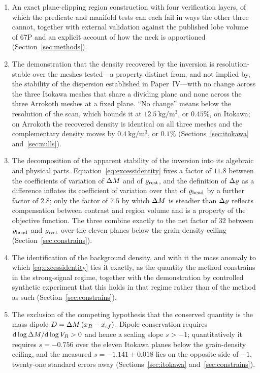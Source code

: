 \begin{enumerate}
\item An exact plane-clipping region construction with four verification
layers, of which the predicate and manifold tests can each fail in ways
the other three cannot, together with external validation against the
published lobe volume of 67P and an explicit account of how the neck is
apportioned (Section~\ref{sec:methods}).

\item The demonstration that the density recovered by the inversion is
resolution-stable over the meshes tested---a property distinct from, and
not implied by, the stability of the dispersion established in
Paper~IV---with no change across the three Itokawa meshes that share a
dividing plane and none across the three Arrokoth meshes at a fixed plane.
``No change'' means below the resolution of the scan, which bounds it at
$\SI{12.5}{\kilo\gram\per\cubic\metre}$, or $0.45\%$, on Itokawa; on
Arrokoth the recovered density is identical on all three meshes and the
complementary density moves by $\SI{0.4}{\kilo\gram\per\cubic\metre}$, or
$0.1\%$ (Sections~\ref{sec:itokawa} and~\ref{sec:nulls}).

\item The decomposition of the apparent stability of the inversion into
its algebraic and physical parts. Equation~\eqref{eq:excessidentity}
fixes a factor of $11.8$ between the coefficients of variation of $\Delta M$
and of $\varrho_{\mathrm{rest}}$, and the definition of $\Delta\varrho$ as a difference inflates
its coefficient of variation over that of $\varrho_{\mathrm{head}}$ by a further factor of
$2.8$; only the factor of $7.5$ by which $\Delta M$ is steadier than $\Delta\varrho$
reflects compensation between contrast and region volume and is a property
of the objective function. The three combine exactly to the net factor of
$32$ between $\varrho_{\mathrm{head}}$ and $\varrho_{\mathrm{rest}}$ over the eleven planes below the
grain-density ceiling (Section~\ref{sec:constrains}).

\item The identification of the background density, and with it the mass
anomaly to which \eqref{eq:excessidentity} ties it exactly, as the
quantity the method constrains in the strong-signal regime, together
with the demonstration by controlled synthetic experiment that this
holds in that regime rather than of the method as such
(Section~\ref{sec:constrains}).

\item The exclusion of the competing hypothesis that the conserved
quantity is the mass dipole $D=\Delta M\,(x_{R}-x_{cf})$. Dipole
conservation requires $\mathrm{d}\log\Delta M/\mathrm{d}\log V_{R}>0$ and
hence a scaling slope $s>-1$; quantitatively it requires $s=-0.756$ over
the eleven Itokawa planes below the grain-density ceiling, and the measured
$s=-1.141\pm0.018$ lies on the opposite side of $-1$, twenty-one standard
errors away (Sections~\ref{sec:itokawa} and~\ref{sec:constrains}).


\end{enumerate}
